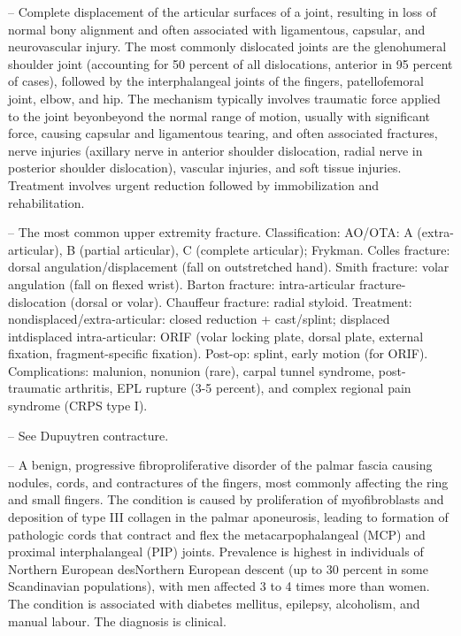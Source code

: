 -- Complete displacement of the articular surfaces of a joint, resulting in loss of normal bony alignment and often associated with ligamentous, capsular, and neurovascular injury. The most commonly dislocated joints are the glenohumeral shoulder joint (accounting for 50 percent of all dislocations, anterior in 95 percent of cases), followed by the interphalangeal joints of the fingers, patellofemoral joint, elbow, and hip. The mechanism typically involves traumatic force applied to the joint beyonbeyond the normal range of motion, usually with significant force, causing capsular and ligamentous tearing, and often associated fractures, nerve injuries (axillary nerve in anterior shoulder dislocation, radial nerve in posterior shoulder dislocation), vascular injuries, and soft tissue injuries. Treatment involves urgent reduction followed by immobilization and rehabilitation.

-- The most common upper extremity fracture. Classification: AO/OTA: A (extra-articular), B (partial articular), C (complete articular); Frykman. Colles fracture: dorsal angulation/displacement (fall on outstretched hand). Smith fracture: volar angulation (fall on flexed wrist). Barton fracture: intra-articular fracture-dislocation (dorsal or volar). Chauffeur fracture: radial styloid. Treatment: nondisplaced/extra-articular: closed reduction + cast/splint; displaced intdisplaced intra-articular: ORIF (volar locking plate, dorsal plate, external fixation, fragment-specific fixation). Post-op: splint, early motion (for ORIF). Complications: malunion, nonunion (rare), carpal tunnel syndrome, post-traumatic arthritis, EPL rupture (3-5 percent), and complex regional pain syndrome (CRPS type I).

-- See Dupuytren contracture.

-- A benign, progressive fibroproliferative disorder of the palmar fascia causing nodules, cords, and contractures of the fingers, most commonly affecting the ring and small fingers. The condition is caused by proliferation of myofibroblasts and deposition of type III collagen in the palmar aponeurosis, leading to formation of pathologic cords that contract and flex the metacarpophalangeal (MCP) and proximal interphalangeal (PIP) joints. Prevalence is highest in individuals of Northern European desNorthern European descent (up to 30 percent in some Scandinavian populations), with men affected 3 to 4 times more than women. The condition is associated with diabetes mellitus, epilepsy, alcoholism, and manual labour. The diagnosis is clinical.

